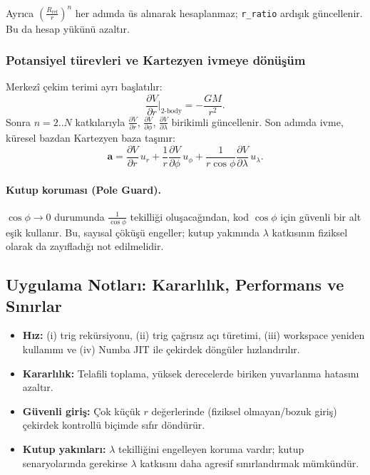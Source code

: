 Ayrıca $\left(\frac{R_\text{ref}}{r}\right)^n$ her adımda üs alınarak hesaplanmaz;
\texttt{r\_ratio} ardışık güncellenir. Bu da hesap yükünü azaltır.

\subsubsection{Potansiyel türevleri ve Kartezyen ivmeye dönüşüm}

Merkezî çekim terimi ayrı başlatılır:
\[
\frac{\partial V}{\partial r}\Big|_{2\text{-body}}=-\frac{GM}{r^2}.
\]
Sonra $n=2..N$ katkılarıyla
$\frac{\partial V}{\partial r}$, $\frac{\partial V}{\partial \phi}$,
$\frac{\partial V}{\partial \lambda}$ birikimli güncellenir.
Son adımda ivme, küresel bazdan Kartezyen baza taşınır:
\[
\mathbf{a} = \frac{\partial V}{\partial r}\,u_r
+ \frac{1}{r}\frac{\partial V}{\partial \phi}\,u_\phi
+ \frac{1}{r\cos\phi}\frac{\partial V}{\partial \lambda}\,u_\lambda.
\]

\paragraph{Kutup koruması (Pole Guard).}
$\cos\phi\rightarrow 0$ durumunda $\frac{1}{\cos\phi}$ tekilliği oluşacağından,
kod $\cos\phi$ için güvenli bir alt eşik kullanır.
Bu, sayısal çöküşü engeller; kutup yakınında $\lambda$ katkısının fiziksel olarak da zayıfladığı
not edilmelidir.

\subsection*{Uygulama Notları: Kararlılık, Performans ve Sınırlar}

\begin{itemize}
  \item \textbf{Hız:} (i) trig rekürsiyonu, (ii) trig çağrısız açı türetimi,
  (iii) workspace yeniden kullanımı ve (iv) Numba JIT ile çekirdek döngüler hızlandırılır.
  \item \textbf{Kararlılık:} Telafili toplama, yüksek derecelerde biriken yuvarlanma hatasını azaltır.
  \item \textbf{Güvenli giriş:} Çok küçük $r$ değerlerinde (fiziksel olmayan/bozuk giriş)
  çekirdek kontrollü biçimde sıfır döndürür.
  \item \textbf{Kutup yakınları:} $\lambda$ tekilliğini engelleyen koruma vardır; kutup senaryolarında
  gerekirse $\lambda$ katkısını daha agresif sınırlandırmak mümkündür.
\end{itemize}

